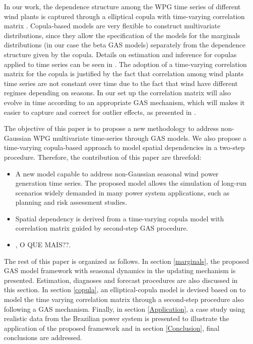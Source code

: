 \documentclass[a4paper]{IEEEtran}
\begin{document}
In our work, the dependence structure among the WPG time series of different wind plants is captured through a elliptical copula with time-varying correlation matrix \cite{creal2011dynamic}. Copula-based models are very flexible  to construct multivariate distributions, since they allow the specification of the models for the marginals distributions (in our case the beta GAS models) separately from the dependence structure given by the copula.
Details on estimation and inference for copulas applied to time series can be seen in \cite{cherubini2004copula,joe2005asymptotic, patton2012copula, patton2009copula, patton2006modelling, patton2002applications}. The adoption of a time-varying correlation matrix for the copula is justified by the fact that correlation among wind plants time series are not constant over time due to the fact that wind have different regimes depending on seasons. In our set up the correlation matrix will also evolve in time according to an appropriate GAS mechanism, which will makes it easier to capture and correct for outlier effects, as presented in \cite{creal2011dynamic}.

The objective of this paper is to propose a new methodology to address non-Gaussian WPG multivariate time-series through GAS models. We also propose a time-varying copula-based approach to model spatial dependencies in a two-step procedure. Therefore, the contribution of this paper are threefold:

\begin{itemize}
	\item A new model capable to address non-Gaussian seasonal wind power generation time series. The proposed model allows the simulation of long-run scenarios widely demanded in many power system applications, such as planning and risk assessment studies. 

	\item Spatial dependency is derived from a time-varying copula model with correlation matrix guided by second-step GAS procedure.
	
	\item {\color{red}, O QUE MAIS??}.
	
\end{itemize}

The rest of this paper is organized as follows. In section \ref{marginals}, the proposed GAS model framework with seasonal dynamics in the updating mechanism is presented. Estimation, diagnoses and forecast procedures are also discussed in this section. In section \ref{copula}, an elliptical-copula model is devised based on \cite{creal2011dynamic} to model the time varying correlation matrix through a second-step procedure also following a GAS mechanism. Finally, in section \ref{Application}, a case study using realistic data from the Brazilian power system is presented to illustrate the application of the proposed framework and in section \ref{Conclusion}, final conclusions are addressed.
\end{document}
